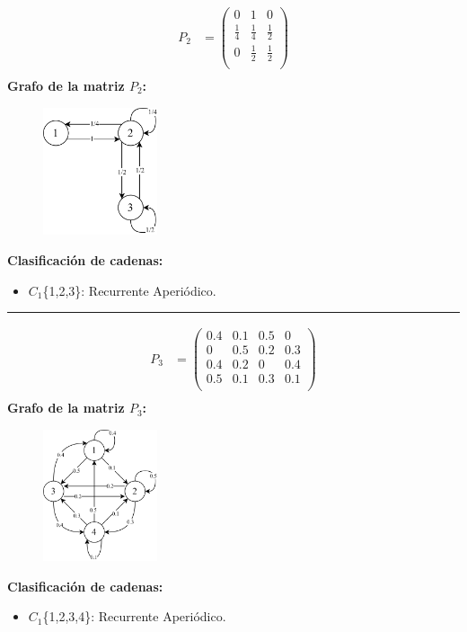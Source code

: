 \documentclass{templateNote}
\begin{document}
\begin{enumerate}
    \begin{align*}
        P_2 &= \left(
            \begin{array}{ccc}    
                0   & 1   & 0  \\
                \frac{1}{4} & \frac{1}{4} & \frac{1}{2}  \\
                0 & \frac{1}{2} & \frac{1}{2}\\
            \end{array}
            \right)\\
    \end{align*}
    \textbf{Grafo de la matriz $P_2$:}
    \begin{figure}[H]
        \centering
        \includegraphics[width=0.3\textwidth]{img/ejer12_2.png}
    \end{figure}
    \textbf{Clasificación de cadenas:}
    \begin{itemize}
        \item $C_1$\{1,2,3\}: Recurrente Aperiódico. 
    \end{itemize}

    \rule{0.8\textwidth}{0.4pt} 

    \begin{align*}
        P_3 &= \left(
            \begin{array}{cccc}    
                0.4&0.1&0.5&0\\
                0&0.5&0.2&0.3\\
                0.4&0.2&0&0.4\\
                0.5&0.1&0.3&0.1\\
            \end{array}
            \right)\\
    \end{align*}
    \textbf{Grafo de la matriz $P_3$:}
    \begin{figure}[H]
        \centering
        \includegraphics[width=0.3\textwidth]{img/ejer13_2.png}
    \end{figure}
    \textbf{Clasificación de cadenas:}
    \begin{itemize}
        \item $C_1$\{1,2,3,4\}: Recurrente Aperiódico. 
    \end{itemize}


\end{enumerate}
\end{document}
